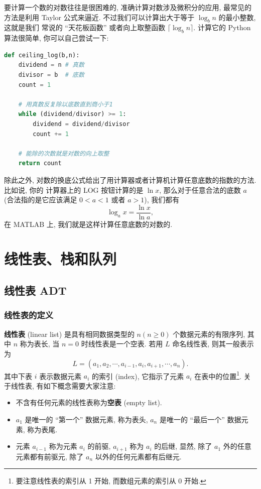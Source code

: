 \documentclass[10pt,UTF8]{book} %
\begin{document}
要计算一个数的对数往往是很困难的, 准确计算对数涉及微积分的应用, 最常见的方法是利用
Taylor 公式来逼近. 不过我们可以计算出大于等于 $\log_b n$ 的最小整数, 这就是我们
常说的 “天花板函数” 或者向上取整函数 $\lceil \log_b n \rceil$. 计算它的 Python
算法很简单, 你可以自己尝试一下:
\begin{lstlisting}[language=Python]
def ceiling_log(b,n):
    dividend = n # 真数
    divisor = b  # 底数
    count = 1

    # 用真数反复除以底数直到商小于1
    while (dividend/divisor) >= 1:
        dividend = dividend/divisor
        count += 1
    
    # 能除的次数就是对数的向上取整
    return count
\end{lstlisting}
除此之外, 对数的换底公式给出了用计算器或者计算机计算任意底数的指数的方法. 比如说, 你的
计算器上的 LOG 按钮计算的是 $\ln x$, 那么对于任意合法的底数 $a$ (合法指的是它应该满足 
$0<a<1$ 或者 $a>1$), 我们都有
\[ \log_a x = \dfrac{\ln x}{\ln a}, \]
在 MATLAB 上, 我们就是这样计算任意底数的对数的.

\newpage
\thispagestyle{empty}

\chapter{线性表、栈和队列}

\section{线性表 ADT}

\subsection{线性表的定义}

\textbf{线性表} (linear list) 是具有相同数据类型的 $n (n \geqslant 0)$ 
个数据元素的有限序列, 其中 $n$ 称为表长, 当 $n=0$ 时线性表是一个空表. 
若用 $L$ 命名线性表, 则其一般表示为
\[ L = \left( a_1, a_2, \cdots, a_{i-1}, a_{i}, a_{i+1}, \cdots, a_n \right). \]
其中下表 $i$ 表示数据元素 $a_i$ 的索引 (index), 它指示了元素 $a_i$ 在表中的位置\footnote{
    要注意线性表的索引从 1 开始, 而数组元素的索引从 0 开始.
}.
关于线性表, 有如下概念需要大家注意:
\begin{itemize}[itemsep=0pt]
    \item 不含有任何元素的线性表称为\textbf{空表} (empty list).
    \item $a_1$ 是唯一的 “第一个” 数据元素, 称为表头, $a_n$ 是唯一的 “最后一个” 数据元素,
    称为表尾.
    \item 元素 $a_{i-1}$ 称为元素 $a_i$ 的前驱, $a_{i+1}$ 称为 $a_i$ 的后继,
    显然, 除了 $a_1$ 外的任意元素都有前驱元, 除了 $a_n$ 以外的任何元素都有后继元.
\end{itemize}
\end{document}
